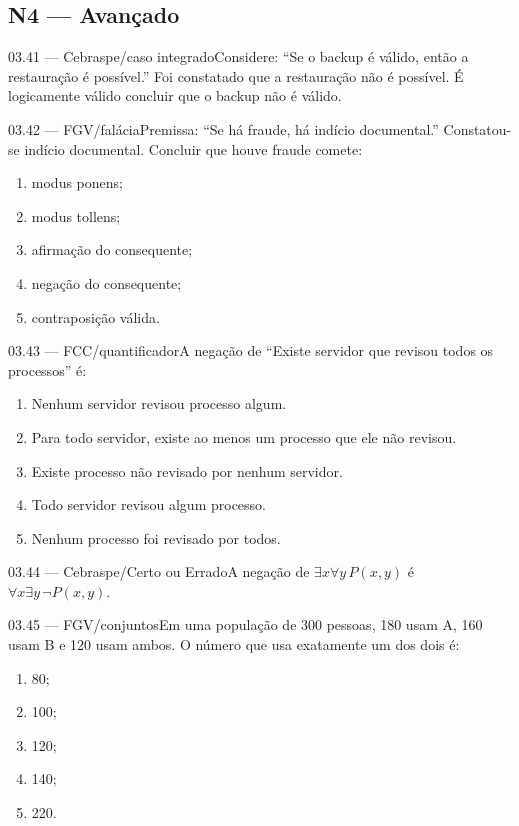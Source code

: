 \subsection*{N4 — Avançado}
\begin{questao}{ 03.41 — Cebraspe/caso integrado}Considere: ``Se o backup é válido, então a restauração é possível.'' Foi constatado que a restauração não é possível. É logicamente válido concluir que o backup não é válido.\end{questao}
\begin{questao}{ 03.42 — FGV/falácia}Premissa: ``Se há fraude, há indício documental.'' Constatou-se indício documental. Concluir que houve fraude comete:\begin{enumerate}[label=\Alph*)]\item modus ponens;\item modus tollens;\item afirmação do consequente;\item negação do consequente;\item contraposição válida.\end{enumerate}\end{questao}
\begin{questao}{ 03.43 — FCC/quantificador}A negação de ``Existe servidor que revisou todos os processos'' é:\begin{enumerate}[label=\Alph*)]\item Nenhum servidor revisou processo algum.\item Para todo servidor, existe ao menos um processo que ele não revisou.\item Existe processo não revisado por nenhum servidor.\item Todo servidor revisou algum processo.\item Nenhum processo foi revisado por todos.\end{enumerate}\end{questao}
\begin{questao}{ 03.44 — Cebraspe/Certo ou Errado}A negação de $\exists x\forall y\,P(x,y)$ é $\forall x\exists y\,\neg P(x,y)$.\end{questao}
\begin{questao}{ 03.45 — FGV/conjuntos}Em uma população de 300 pessoas, 180 usam A, 160 usam B e 120 usam ambos. O número que usa exatamente um dos dois é:\begin{enumerate}[label=\Alph*)]\item 80;\item 100;\item 120;\item 140;\item 220.\end{enumerate}\end{questao}
